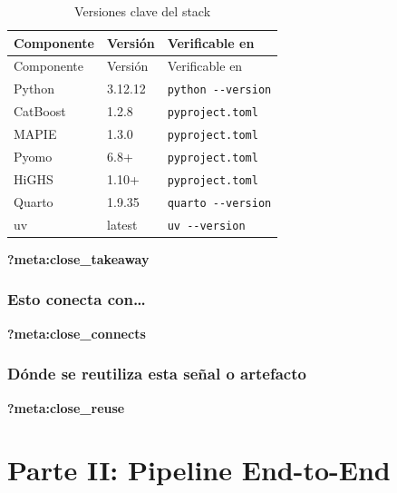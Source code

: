 \documentclass[
  spanish,
  11pt,
  letterpaper,
]{scrbook}
\theoremstyle{plain}
\theoremstyle{remark}
\begin{document}
\begin{longtable}[]{@{}lll@{}}
\caption{Versiones clave del stack}\label{tbl-versions}\tabularnewline
\toprule\noalign{}
Componente & Versión & Verificable en \\
\midrule\noalign{}
\endfirsthead
\toprule\noalign{}
Componente & Versión & Verificable en \\
\midrule\noalign{}
\endhead
\bottomrule\noalign{}
\endlastfoot
Python & 3.12.12 & \texttt{python\ -\/-version} \\
CatBoost & 1.2.8 & \texttt{pyproject.toml} \\
MAPIE & 1.3.0 & \texttt{pyproject.toml} \\
Pyomo & 6.8+ & \texttt{pyproject.toml} \\
HiGHS & 1.10+ & \texttt{pyproject.toml} \\
Quarto & 1.9.35 & \texttt{quarto\ -\/-version} \\
uv & latest & \texttt{uv\ -\/-version} \\
\end{longtable}

\begin{tcolorbox}[enhanced jigsaw, arc=.35mm, bottomrule=.15mm, bottomtitle=1mm, breakable, colback=white, colbacktitle=quarto-callout-tip-color!10!white, colframe=quarto-callout-tip-color-frame, coltitle=black, left=2mm, leftrule=.75mm, opacityback=0, opacitybacktitle=0.6, rightrule=.15mm, title=\textcolor{quarto-callout-tip-color}{\faLightbulb}\hspace{0.5em}{Qué debes quedarte}, titlerule=0mm, toprule=.15mm, toptitle=1mm]

\textbf{?meta:close\_takeaway}

\section{Esto conecta con\ldots{}}\label{esto-conecta-con-1}

\textbf{?meta:close\_connects}

\section{Dónde se reutiliza esta señal o
artefacto}\label{duxf3nde-se-reutiliza-esta-seuxf1al-o-artefacto-1}

\textbf{?meta:close\_reuse}

\end{tcolorbox}

\part{Parte II: Pipeline End-to-End}
\end{document}
